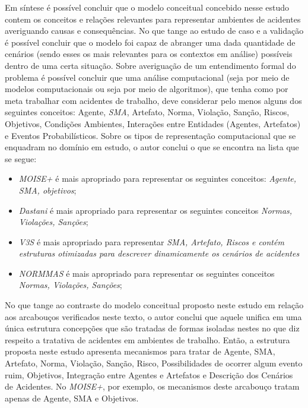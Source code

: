 Em síntese é possível concluir que o modelo conceitual concebido nesse estudo contem os conceitos e relações relevantes para representar ambientes de acidentes averiguando causas e consequências. No que tange ao estudo de caso e a validação é possível concluir que o modelo foi capaz de abranger uma dada quantidade de cenários (sendo esses os mais relevantes para os contextos em análise) possíveis dentro de uma certa situação. Sobre averiguação de um entendimento formal do problema é possível concluir que uma análise computacional (seja por meio de modelos computacionais ou seja por meio de algoritmos), que tenha como por meta trabalhar com acidentes de trabalho, deve considerar pelo menos alguns dos seguintes conceitos: Agente, \textit{SMA}, Artefato, Norma, Violação, Sanção, Riscos, Objetivos, Condições Ambientes, Interações entre Entidades (Agentes, Artefatos) e Eventos Probabilísticos. Sobre os tipos de representação computacional que se enquadram no domínio em estudo, o autor conclui o que se encontra na lista que se segue:
\begin{itemize}
    \item \textit{MOISE+} é mais apropriado para representar os seguintes conceitos: \textit{Agente, SMA, objetivos};
    \item \textit{Dastani} é mais apropriado para representar os seguintes conceitos \textit{Normas, Violações, Sanções};
    \item \textit{V3S} é mais apropriado para representar \textit{SMA, Artefato, Riscos e contém estruturas otimizadas para descrever dinamicamente os cenários de acidentes}
    \item \textit{NORMMAS} é mais apropriado para representar os seguintes conceitos \textit{Normas, Violações, Sanções};
\end{itemize}

No que tange ao contraste do modelo conceitual proposto neste estudo em relação aos arcabouços verificados neste texto, o autor conclui que aquele unifica em uma única estrutura concepções que são tratadas de formas isoladas nestes no que diz respeito a tratativa de acidentes em ambientes de trabalho. Então, a estrutura proposta neste estudo apresenta mecanismos para tratar de Agente, SMA, Artefato, Norma, Violação, Sanção, Risco, Possibilidades de ocorrer algum evento ruim, Objetivos, Integração entre Agentes e Artefatos e Descrição dos Cenários de Acidentes. No \textit{MOISE+}, por exemplo, os mecanismos deste arcabouço tratam apenas de Agente, SMA e Objetivos.